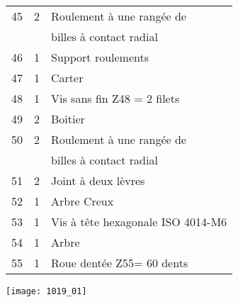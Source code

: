 \begin{multicols}{2}
\begin{center}
\begin{tabular}{|l|l|l|}
45&
2&
Roulement à une rangée de \\ 
&& billes à contact radial \\ \hline %
46&
1&
Support roulements \\ \hline %
47&
1&
Carter \\ \hline %
48&
1&
Vis sans fin Z48 = 2 filets \\ \hline %
49&
2&
Boitier\\ \hline %
50&
2&
Roulement à une rangée de \\ 
&& billes à contact radial\\  \hline %
51&
2&
Joint à deux lèvres \\ \hline %
52&
1&
Arbre Creux\\ \hline %
53&
1&
Vis à tête hexagonale ISO 4014-M6 \\ \hline %
54 & 
1 &
Arbre \\ \hline %
55 &
1&
Roue dentée Z55= 60 dents  \\ \hline %
\end{tabular}
\end{center}

\end{multicols}

\fi

\ifprof
\else
\fi

\ifprof
\else
\fi

\ifprof
\else
\fi


\ifprof
\else
\fi


\ifprof
\else
\begin{center}
\texttt{[image: 1019\_01]}
\end{center}
\fi


